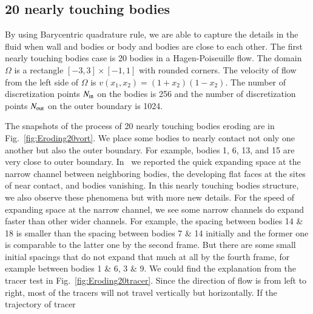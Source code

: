 \documentclass[preprint, 10pt]{elsarticle}
\begin{document}
\subsection{20 nearly touching bodies}
{\color{red} 
By using Barycentric quadrature rule, we are able to capture the details in the fluid when wall and bodies or body and bodies are close to each other. The first nearly touching bodies case is 20 bodies in a Hagen-Poiseuille flow. The domain $\Omega$ is a rectangle $[-3,3]\times[-1,1]$ with rounded corners. The velocity of flow from the left side of $\Omega$ is $v(x_1,x_2)=(1+x_2)(1-x_2)$. The number of discretization points $N_{\mathrm{in}}$ on the bodies is 256 and the number of discretization points $N_{\mathrm{out}}$ on the outer boundary is 1024. 

The snapshots of the process of 20 nearly touching bodies eroding are in Fig.~\ref{fig:Eroding20vort}. 
We place some bodies to nearly contact not only one another but also the outer boundary. For example, bodies 1, 6, 13, and 15 are very close to outer boundary. In~\cite{qua-moo2018} we reported the quick expanding space at the narrow channel between neighboring bodies, the developing flat faces at the sites of near contact, and bodies vanishing. In this nearly touching bodies structure, we also observe these phenomena but with more new details.
For the speed of expanding space at the narrow channel, we see some narrow channels do expand faster than other wider channels. For example, the spacing between bodies 14 \& 18 is smaller than the spacing between bodies
 7 \& 14 initially and the former one is comparable to the latter one by the second frame. But there are some small initial spacings that do not expand that much at all by the fourth frame, for example between bodies 1 \& 6, 3 \& 9. 
We could find the explanation from the tracer test in Fig.~\ref{fig:Eroding20tracer}. Since the direction of flow is from left to right, most of the tracers will not travel vertically but horizontally. If the trajectory of tracer }
\end{document}
